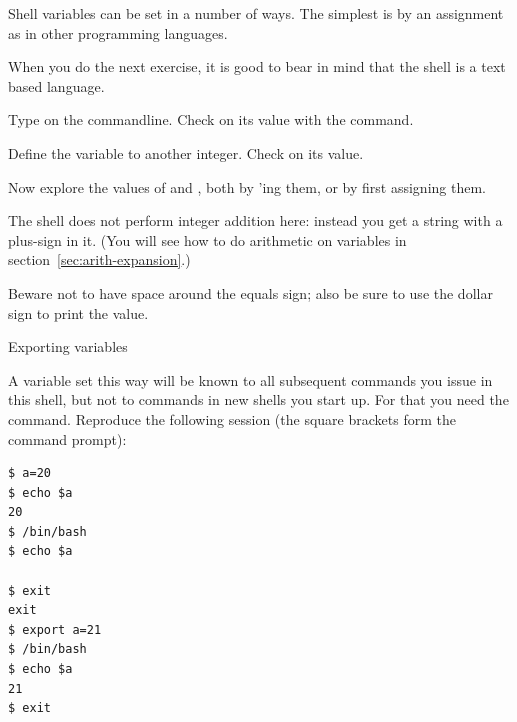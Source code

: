 Shell variables can be set in a number of ways. The simplest
is by an assignment as in other programming languages.

When you do the next exercise,
it is good to bear in mind that the shell is a text based language.

\begin{exercise}
  Type  on the commandline. Check on its value with the  command.

  Define the variable  to another integer. Check on its value.

  Now explore the values of  and , both by 'ing them,
  or by first assigning them.
\end{exercise}
\begin{outcome}
  The shell does not perform integer addition here: instead you get a string
  with a plus-sign in it.
  (You will see how to do arithmetic on variables in section~\ref{sec:arith-expansion}.)
\end{outcome}
\begin{caution}
  Beware not to have space
    around the equals sign; also be sure to use the dollar sign to print
    the value.
\end{caution}

 {Exporting variables}

A variable set this way will be known to all subsequent commands
you issue in this shell, but not to commands in new shells you start up.
For that you need the  command.
Reproduce the following session (the square brackets form the command prompt):
\begin{lstlisting}
$ a=20
$ echo $a
20
$ /bin/bash
$ echo $a

$ exit
exit
$ export a=21
$ /bin/bash
$ echo $a
21
$ exit
\end{lstlisting}

